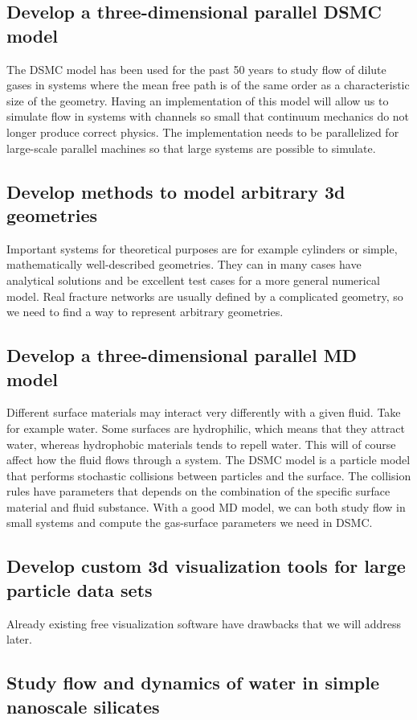 \subsection{Develop a three-dimensional parallel DSMC model}
The DSMC model has been used for the past 50 years to study flow of dilute gases in systems where the mean free path is of the same order as a characteristic size of the geometry. Having an implementation of this model will allow us to simulate flow in systems with channels so small that continuum mechanics do not longer produce correct physics. The implementation needs to be parallelized for large-scale parallel machines so that large systems are possible to simulate.
\subsection{Develop methods to model arbitrary 3d geometries}
Important systems for theoretical purposes are for example cylinders or simple, mathematically well-described geometries. They can in many cases have analytical solutions and be excellent test cases for a more general numerical model. Real fracture networks are usually defined by a complicated geometry, so we need to find a way to represent arbitrary geometries.
\subsection{Develop a three-dimensional parallel MD model}
Different surface materials may interact very differently with a given fluid. Take for example water. Some surfaces are hydrophilic, which means that they attract water, whereas hydrophobic materials tends to repell water. This will of course affect how the fluid flows through a system. The DSMC model is a particle model that performs stochastic collisions between particles and the surface. The collision rules have parameters that depends on the combination of the specific surface material and fluid substance. With a good MD model, we can both study flow in small systems and compute the gas-surface parameters we need in DSMC. 
\subsection{Develop custom 3d visualization tools for large particle data sets}
Already existing free visualization software have drawbacks that we will address later. 

\subsection{Study flow and dynamics of water in simple nanoscale silicates}

